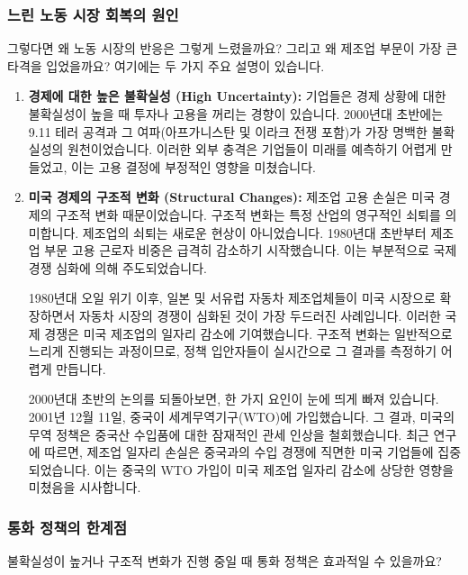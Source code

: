 \documentclass[11pt,a4paper]{book}
\theoremstyle{definition}
\begin{document}
\subsubsection{느린 노동 시장 회복의 원인}
그렇다면 왜 노동 시장의 반응은 그렇게 느렸을까요? 그리고 왜 제조업 부문이 가장 큰 타격을 입었을까요? 여기에는 두 가지 주요 설명이 있습니다.

\begin{enumerate}
    \item \textbf{경제에 대한 높은 불확실성 (High Uncertainty):}
    기업들은 경제 상황에 대한 불확실성이 높을 때 투자나 고용을 꺼리는 경향이 있습니다. 2000년대 초반에는 9.11 테러 공격과 그 여파(아프가니스탄 및 이라크 전쟁 포함)가 가장 명백한 불확실성의 원천이었습니다. 이러한 외부 충격은 기업들이 미래를 예측하기 어렵게 만들었고, 이는 고용 결정에 부정적인 영향을 미쳤습니다.

    \item \textbf{미국 경제의 구조적 변화 (Structural Changes):}
    제조업 고용 손실은 미국 경제의 구조적 변화 때문이었습니다. 구조적 변화는 특정 산업의 영구적인 쇠퇴를 의미합니다. 제조업의 쇠퇴는 새로운 현상이 아니었습니다. 1980년대 초반부터 제조업 부문 고용 근로자 비중은 급격히 감소하기 시작했습니다. 이는 부분적으로 국제 경쟁 심화에 의해 주도되었습니다.

    \begin{examplebox}[title={구조적 변화의 예시: 제조업 쇠퇴}]
    1980년대 오일 위기 이후, 일본 및 서유럽 자동차 제조업체들이 미국 시장으로 확장하면서 자동차 시장의 경쟁이 심화된 것이 가장 두드러진 사례입니다. 이러한 국제 경쟁은 미국 제조업의 일자리 감소에 기여했습니다. 구조적 변화는 일반적으로 느리게 진행되는 과정이므로, 정책 입안자들이 실시간으로 그 결과를 측정하기 어렵게 만듭니다.

    2000년대 초반의 논의를 되돌아보면, 한 가지 요인이 눈에 띄게 빠져 있습니다. 2001년 12월 11일, 중국이 세계무역기구(WTO)에 가입했습니다. 그 결과, 미국의 무역 정책은 중국산 수입품에 대한 잠재적인 관세 인상을 철회했습니다. 최근 연구에 따르면, 제조업 일자리 손실은 중국과의 수입 경쟁에 직면한 미국 기업들에 집중되었습니다. 이는 중국의 WTO 가입이 미국 제조업 일자리 감소에 상당한 영향을 미쳤음을 시사합니다.
    \end{examplebox}
\end{enumerate}

\subsubsection{통화 정책의 한계점}
불확실성이 높거나 구조적 변화가 진행 중일 때 통화 정책은 효과적일 수 있을까요?
\end{document}
